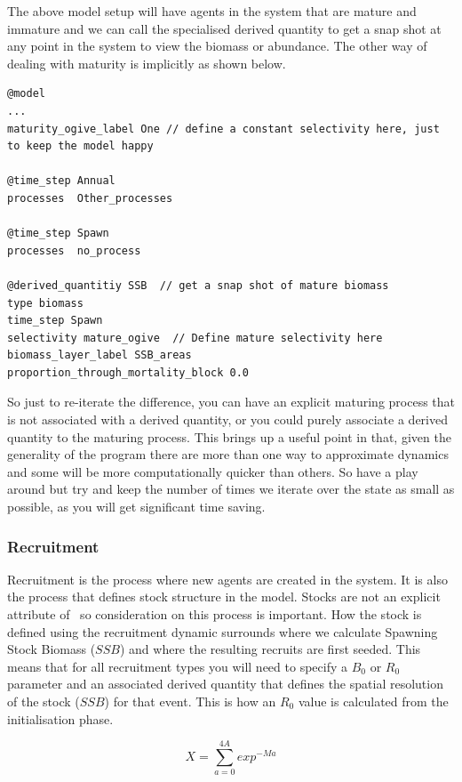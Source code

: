 The above model setup will have agents in the system that are mature and immature and we can call the specialised  derived quantity to get a snap shot at any point in the system to view the biomass or abundance. The other way of dealing with maturity is implicitly as shown below.

{\small{\begin{verbatim}
@model
...
maturity_ogive_label One // define a constant selectivity here, just to keep the model happy

@time_step Annual
processes  Other_processes

@time_step Spawn
processes  no_process 	
	
@derived_quantitiy SSB  // get a snap shot of mature biomass
type biomass
time_step Spawn
selectivity mature_ogive  // Define mature selectivity here
biomass_layer_label SSB_areas
proportion_through_mortality_block 0.0
\end{verbatim}}}

So just to re-iterate the difference, you can have an explicit maturing process that is not associated with a derived quantity, or you could purely associate a derived quantity to the maturing process. This brings up a useful point in that, given the generality of the program there are more than one way to approximate dynamics and some will be more computationally quicker than others. So have a play around but try and keep the number of times we iterate over the state as small as possible, as you will get significant time saving.


\subsubsection{Recruitment}
Recruitment is the process where new agents are created in the system. It is also the process that defines stock structure in the model. Stocks are not an explicit attribute of \IBM\ so consideration on this process is important. How the stock is defined using the recruitment dynamic surrounds where we calculate Spawning Stock Biomass ($SSB$) and where the resulting recruits are first seeded. This means that for all recruitment types you will need to specify a $B_0$ or \(R_0\) parameter and an associated derived quantity that defines the spatial resolution of the stock ($SSB$) for that event. This is how an $R_0$ value is calculated from the initialisation phase.

\begin{equation}
	X = \sum_{a = 0}^{4A}exp^{-M a}
\end{equation}

